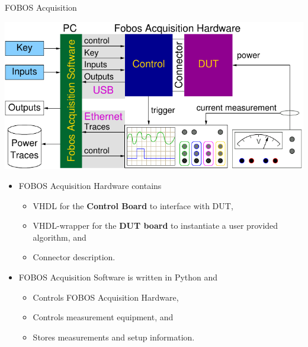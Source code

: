 \documentclass[xcolor=pdftex,dvipsnames,table,final]{beamer}
\begin{document}
\begin{frame}[fragile]{}
\begin{columns}[t]
\begin{column}{.31\linewidth}
      \begin{block}{FOBOS Acquisition}
        \begin{center}
          \includegraphics[scale=1.7]{../figures/fobos-dac}
        \end{center} 

          \begin{itemize}
            \item FOBOS Acquisition Hardware contains 
            \begin{itemize}
              \item VHDL for the \textbf{Control Board} to interface with DUT,
              \item VHDL-wrapper for the \textbf{DUT board} to instantiate a user provided algorithm, and
              \item Connector description.
            \end{itemize}
            \item FOBOS Acquisition Software is written in Python and 
            \begin{itemize}
              \item Controls FOBOS Acquisition Hardware,
              \item Controls measurement equipment, and
              \item Stores measurements and setup information.
            \end{itemize}
          \end{itemize}
       \end{block}
     

\end{column}
\end{columns}
\end{frame}
\end{document}
